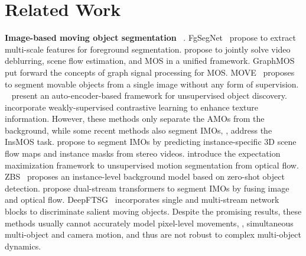 \section{Related Work}
\label{sec:related}

\noindent\textbf{Image-based moving object segmentation} 
~\citep{mos:tokmakov_learning2seg_IJCV_2019}. 
FgSegNet~\citep{cd:lim_fgsegnet_PRL_2018, cd:lim_fgsegnetv2_PAA_2020} propose to extract multi-scale features for foreground segmentation. 
\cite{mos:pan_jointstereomos_TIP_2020} propose to jointly solve video deblurring, scene flow estimation, and MOS in a unified framework. 
GraphMOS~\citep{mos:giraldo_graphmos_TPAMI_2020} put forward the concepts of graph signal processing for MOS. 
MOVE~\citep{mos:bielski_move_NeurIPS_2022} proposes to segment movable objects from a single image without any form of supervision.
~\cite{objdis:bao_discovering_CVPR_2022} present an auto-encoder-based framework for unsupervised object discovery.
~\cite{objdis:lv_weaklycontrastive_arXiv_2023} incorporate weakly-supervised contrastive learning to enhance texture information.
However, these methods only separate the AMOs from the background, while some recent methods also segment IMOs, \ie, address the InsMOS task.
\cite{mos:cao_independent_stereoscopic_CVPR_2019} propose to segment IMOs by predicting instance-specific 3D scene flow maps and instance masks from stereo videos.
\cite{mos:Meunier_EMMOS_TPAMI_2023} introduce the expectation maximization framework to unsupervised motion segmentation from optical flow. 
ZBS~\citep{cd:an_zbs_CVPR_2023} proposes an instance-level background model based on zero-shot object detection. 
\cite{mos:homeyer_mostrans_ICCVW_2023} propose dual-stream transformers to segment IMOs by fusing image and optical flow. 
DeepFTSG~\citep{cd:rahmon_deepftsg_IJCV_2024} incorporates single and multi-stream network blocks to discriminate salient moving objects. 
Despite the promising results, these methods usually cannot accurately model pixel-level movements, \eg, simultaneous multi-object and camera motion, and thus are not robust to complex multi-object dynamics. 


